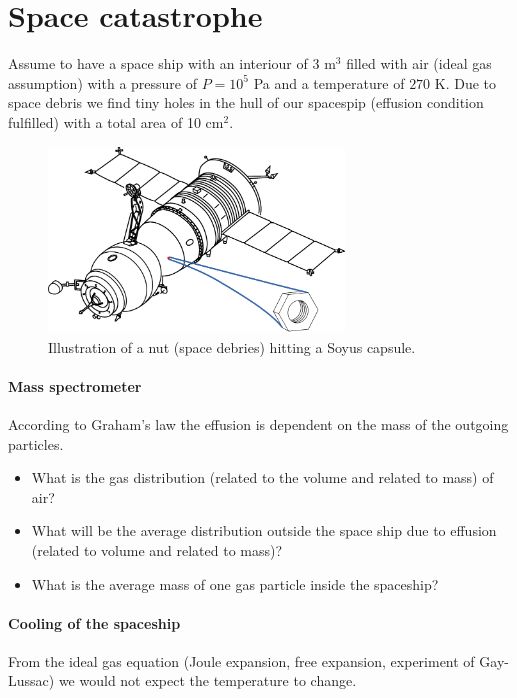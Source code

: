 \documentclass[12pt,a4paper]{article} %
\begin{document}
\section{Space catastrophe}

Assume to have a space ship with an interiour of 3 m$^3$ filled with air (ideal gas assumption) with a pressure of $P = 10^5$ Pa and a temperature of $270$ K. 
Due to space debris we find tiny holes in the hull of our spacespip (effusion condition fulfilled) with a total area of 10 cm$^2$. 

\begin{figure}
	\begin{center}
		\includegraphics[width = 0.7\textwidth]{space_ship.png}
		\caption{Illustration of a nut (space debries) hitting a Soyus capsule.}
	\end{center}
\end{figure}
\paragraph{Mass spectrometer}
According to Graham's law the effusion is dependent on the mass of the outgoing particles.
\begin{itemize}
\item What is the gas distribution (related to the volume and related to mass) of air? 
\item What will be the average distribution outside the space ship due to effusion (related to volume and related to mass)?
 \item What is the average mass of one gas particle inside the spaceship?
 
 \end{itemize}
 \paragraph{Cooling of the spaceship}
 From the ideal gas equation (Joule expansion, free expansion, experiment of Gay-Lussac) we would not expect the temperature to change. 
 
\end{document}
